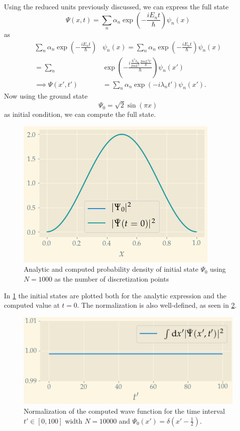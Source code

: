 Using the reduced units previously discussed, we can express the full state
\begin{equation} 
\Psi(x, t) = \sum_n\alpha_n\exp(-\frac{iE_n t}{\hbar})\psi_n(x)
\end{equation}
as
\begin{align} 
\sum_n\alpha_n\exp(-\frac{iE_n t}{\hbar})&\psi_n(x) =\sum_n\alpha_n\exp(-\frac{iE_n t}{\hbar})\psi_n(x)\nonumber \\[1.5ex]\nonumber =\sum_n&\exp(-\frac{i\frac{\hbar^2\lambda_n}{2mL^2}\frac{2mL^2t'}{\hbar}}{\hbar})\psi_n(x') \\[1.5ex]\implies \Psi(x', t')&= \sum_n\alpha_n\exp(-i\lambda_n t')\psi_n(x').\label{eq:full_state}
\end{align}
Now using the ground state
\begin{equation} 
	\label{eq:init}
\Psi_0 = \sqrt2\sin(\pi x)
\end{equation}
as initial condition, we can compute the full state. 
\begin{figure}
	\centering
	\includegraphics[width=\linewidth]{img/init_state}
	\caption{Analytic and computed probability density of initial state $\Psi_0$ using $N = 1000$ as the number of discretization points}
	\label{fig:init_state}
\end{figure}
In \cref{fig:init_state} the initial states are plotted both for the analytic expression and the computed value at $t = 0$.
The normalization is also well-defined, as seen in \cref{fig:normalization}.
\begin{figure}
	\centering
	\includegraphics[width=\linewidth]{img/normalization.png}
	\caption{Normalization of the computed wave function for the time interval $t'\in [0,100]$ width $N =10000$ and $\Psi_0(x') = \delta(x'-\frac12)$.}
	\label{fig:normalization}
\end{figure}
